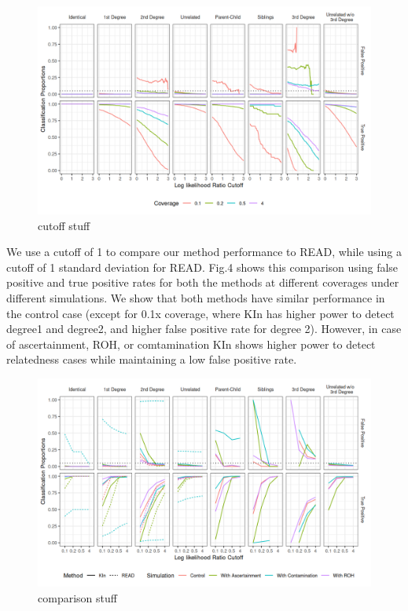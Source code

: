 \documentclass[12pt, letterpaper]{article}
\begin{document}
\begin{figure}[htp]
    \centering
    \includegraphics[width=18cm]{plots/plotimg/contam0_inbred0_model_performance_allroc_asc0_plot.png}
    \caption{cutoff stuff}
    \label{fig:galaxy}
\end{figure}

We use a cutoff of 1 to compare our method performance to READ, while using a cutoff of 1 standard deviation for READ. Fig.4 shows this comparison using false positive and true positive rates for both the methods at different coverages under different simulations. We show that both methods have similar performance in the control case (except for 0.1x coverage, where KIn has higher power to detect degree1 and degree2, and higher false positive rate for degree 2). However, in case of ascertainment, ROH, or comtamination KIn shows higher power to detect relatedness cases while maintaining a low false positive rate. 

\begin{figure}[htp]
    \centering
    \includegraphics[width=18cm]{plots/plotimg/comparison_plot.png}
    \caption{comparison stuff}
    \label{fig:galaxy}
\end{figure}
\end{document}
